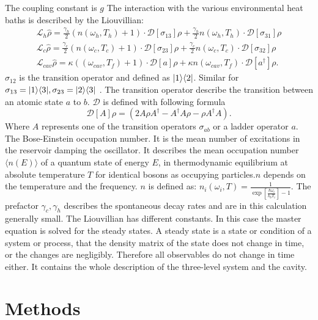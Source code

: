 \documentclass[12pt,a4paper]{article}
\DeclarePairedDelimiter\bra{\langle}{\rvert}
\DeclarePairedDelimiter\ket{\lvert}{\rangle}
\begin{document}
The coupling constant is $g$ %
\newpage
The interaction with the various environmental heat baths is described by the Liouvillian:
\begin{equation}
\begin{aligned}
\mathcal{L}_h\hat{\rho}=\frac{\gamma_h}{2}(n(\omega_h,T_h)+1)   \cdot \mathcal{D}[\sigma_{13}]\rho
+\frac{\gamma_h}{2}n(\omega_h,T_h)\cdot \mathcal{D}[\sigma_{31}]\rho \\
\mathcal{L}_c\hat{\rho}=\frac{\gamma_c}{2}(n(\omega_c,T_c)+1)\cdot \mathcal{D}[\sigma_{23}]\rho
+\frac{\gamma_c}{2}n(\omega_c,T_c) \cdot \mathcal{D}[\sigma_{32}]\rho \\
\mathcal{L}_{cav}\hat{\rho}=\kappa((\omega_{cav},T_f)+1)	\cdot\mathcal{D}[a]\rho+
\kappa n(\omega_{cav},T_f)\cdot \mathcal{D}[a^{\dag}]\rho.
\end{aligned}
\end{equation}
$\sigma_{12} $ is the transition operator and defined as $ \ket{1}\bra{2}$. Similar for $\sigma_{13}=\ket{1}\bra{3}, \sigma_{23}=\ket{2}\bra{3}$ . The transition operator describe the transition between an atomic state $a$ to $b$. 
$\mathcal{D}$ is defined with following formula
\begin{equation}
\mathcal{D}[A]\rho=(2A \rho	A^{\dag}-A^{\dag}A\rho-\rho A^{\dag}A).
\end{equation}
Where $A$ represents one of the transition operators $\sigma_{ab}$ or a ladder operator $a$.
The Bose-Einstein occupation number. It is the mean number of excitations in the reservoir damping the oscillator. It describes the mean occupation number $\langle n(E) \rangle$ of a quantum state of energy $E$, in thermodynamic equilibrium at absolute temperature $T $ for identical bosons as occupying particles.$ n$ depends on the temperature and the frequency.
$n$ is defined as:
$
n_i(\omega_i,T)=\frac{1}{\exp[\frac{\hbar \omega_i}{k_b T_i}]-1}.
$
The  prefactor $\gamma_c ,\gamma_h$ describes the spontaneous decay rates and are in this calculation generally small.
The Liouvillian has different constants. 
In this case the master equation is solved for the steady states.
A steady state is a state or condition of a system or process, that the density matrix of the state does not change in time, or the changes are negligibly. Therefore all observables do not change in time either. 
It contains the whole description of the three-level system and the cavity.
\section{Methods}
\end{document}
